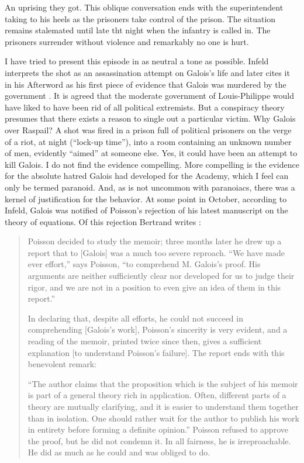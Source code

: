 \documentclass[12pt]{article}
\begin{document}
An uprising they got. This oblique conversation ends with the superintendent taking to his heels as the prisoners take control of the prison. The situation remains stalemated until late tht night when the infantry is called in. The prisoners surrender without violence and remarkably no one is hurt.

I have tried to present this episode in as neutral a tone as possible. Infeld interprets the shot as an assassination attempt on Galois's life and later cites it in his Afterword as his first piece of evidence that Galois was murdered by the government \cite{70}. It is agreed that the moderate government of Louis-Philippe would have liked to have been rid of all political extremists. But a conspiracy theory presumes that there exists a reason to single out a particular victim. Why Galois over Raspail? A shot was fired in a prison full of political prisoners on the verge of a riot, at night (``lock-up time''), into a room containing an unknown number of men, evidently ``aimed'' at someone else. Yes, it could have been an attempt to kill Galois. I do not find the evidence compelling. More compelling is the evidence for the absolute hatred Galois had developed for the Academy, which I feel can only be termed paranoid. And, as is not uncommon with paranoiacs, there was a kernel of justification for the behavior. At some point in October, according to Infeld, Galois was notified of Poisson's rejection of his latest manuscript on the theory of equations. Of this rejection Bertrand writes \cite{71}:

\begin{quotation}
Poisson decided to study the memoir; three months later he drew up a report that to [Galois] was a much too severe reproach. ``We have made ever effort,'' says Poisson, ``to comprehend M. Galois's proof. His arguments are neither sufficiently clear nor developed for us to judge their rigor, and we are not in a position to even give an idea of them in this report.''

In declaring that, despite all efforts, he could not succeed in comprehending [Galois's work], Poisson's sincerity is very evident, and a reading of the memoir, printed twice since then, gives a sufficient explanation [to understand Poisson's failure]. The report ends with this benevolent remark:

``The author claims that the proposition which is the subject of his memoir is part of a general theory rich in application. Often, different parts of a theory are mutually clarifying, and it is easier to understand them together than in isolation. One should rather wait for the author to publish his work in entirety before forming a definite opinion.'' Poisson refused to approve the proof, but he did not condemn it. In all fairness, he is irreproachable. He did as much as he could and was obliged to do.
\end{quotation}
\end{document}
